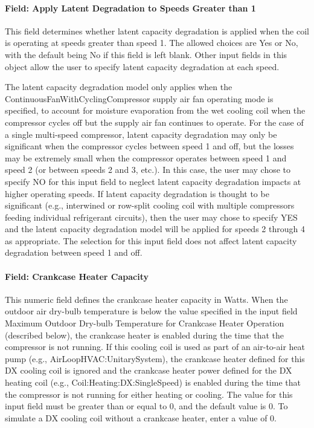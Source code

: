 \paragraph{Field: Apply Latent Degradation to Speeds Greater than 1}\label{field-apply-latent-degradation-to-speeds-greater-than-1}

This field determines whether latent capacity degradation is applied when the coil is operating at speeds greater than speed 1. The allowed choices are Yes or No, with the default being No if this field is left blank. Other input fields in this object allow the user to specify latent capacity degradation at each speed.

The latent capacity degradation model only applies when the ContinuousFanWithCyclingCompressor supply air fan operating mode is specified, to account for moisture evaporation from the wet cooling coil when the compressor cycles off but the supply air fan continues to operate. For the case of a single multi-speed compressor, latent capacity degradation may only be significant when the compressor cycles between speed 1 and off, but the losses may be extremely small when the compressor operates between speed 1 and speed 2 (or between speeds 2 and 3, etc.). In this case, the user may chose to specify NO for this input field to neglect latent capacity degradation impacts at higher operating speeds. If latent capacity degradation is thought to be significant (e.g., interwined or row-split cooling coil with multiple compressors feeding individual refrigerant circuits), then the user may chose to specify YES and the latent capacity degradation model will be applied for speeds 2 through 4 as appropriate. The selection for this input field does not affect latent capacity degradation between speed 1 and off.

\paragraph{Field: Crankcase Heater Capacity}\label{field-crankcase-heater-capacity-2}

This numeric field defines the crankcase heater capacity in Watts. When the outdoor air dry-bulb temperature is below the value specified in the input field Maximum Outdoor Dry-bulb Temperature for Crankcase Heater Operation (described below), the crankcase heater is enabled during the time that the compressor is not running. If this cooling coil is used as part of an air-to-air heat pump (e.g., AirLoopHVAC:UnitarySystem), the crankcase heater defined for this DX cooling coil is ignored and the crankcase heater power defined for the DX heating coil (e.g., Coil:Heating:DX:SingleSpeed) is enabled during the time that the compressor is not running for either heating or cooling. The value for this input field must be greater than or equal to 0, and the default value is 0. To simulate a DX cooling coil without a crankcase heater, enter a value of 0.

